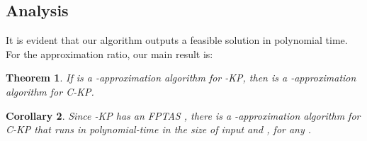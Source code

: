 \documentclass{aamas2013}
\newtheorem{theorem}{Theorem}[section]
\newtheorem{corollary}[theorem]{Corollary}
\begin{document}
\subsection{Analysis}
\noindent
It is evident that our algorithm outputs a feasible solution in polynomial time.  For the approximation ratio, our main result is:

\begin{theorem} 
\label{thm:2apx}
If  is a -approximation algorithm for {-KP}, then  is a -approximation algorithm for {\sc C-KP}.
\end{theorem}


\begin{corollary}
\label{cor:2apx}
Since {-KP} has an FPTAS \cite{BKV05KS, KPP10book}, there is a -approximation algorithm for {\sc C-KP} that runs in polynomial-time in the size of input and , for any .
\end{corollary}   
\end{document}
